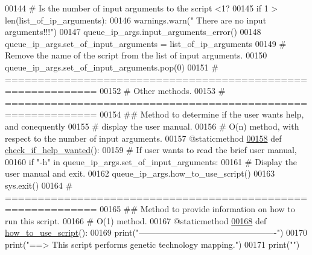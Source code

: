\begin{DoxyCode}
00144         \textcolor{comment}{#   Is the number of input arguments to the script <1?}
00145         \textcolor{keywordflow}{if} 1 > len(list\_of\_ip\_arguments):
00146             warnings.warn(\textcolor{stringliteral}{" There are no input arguments!!!"})
00147             queue\_ip\_args.input\_arguments\_error()
00148         queue\_ip\_args.set\_of\_input\_arguments = list\_of\_ip\_arguments
00149         \textcolor{comment}{# Remove the name of the script from the list of input arguments.}
00150         queue\_ip\_args.set\_of\_input\_arguments.pop(0)
00151     \textcolor{comment}{# ============================================================}
00152     \textcolor{comment}{#   Other methods.}
00153     \textcolor{comment}{# ============================================================}
00154     \textcolor{comment}{##  Method to determine if the user wants help, and conequently}
00155     \textcolor{comment}{#       display the user manual.}
00156     \textcolor{comment}{#   O(n) method, with respect to the number of input arguments.}
00157     @staticmethod
\hypertarget{queue__ip__arguments_8py_source_l00158}{}\hyperlink{classutilities_1_1queue__ip__arguments_1_1queue__ip__args_a1a87ae4035acfa51fe1d1aff53f770f3}{00158}     \textcolor{keyword}{def }\hyperlink{classutilities_1_1queue__ip__arguments_1_1queue__ip__args_a1a87ae4035acfa51fe1d1aff53f770f3}{check\_if\_help\_wanted}():
00159         \textcolor{comment}{# If user wants to read the brief user manual,}
00160         \textcolor{keywordflow}{if} \textcolor{stringliteral}{"-h"} \textcolor{keywordflow}{in} queue\_ip\_args.set\_of\_input\_arguments:
00161             \textcolor{comment}{# Display the user manual and exit.}
00162             queue\_ip\_args.how\_to\_use\_script()
00163             sys.exit()
00164     \textcolor{comment}{# ============================================================}
00165     \textcolor{comment}{##  Method to provide information on how to run this script.}
00166     \textcolor{comment}{#   O(1) method.}
00167     @staticmethod
\hypertarget{queue__ip__arguments_8py_source_l00168}{}\hyperlink{classutilities_1_1queue__ip__arguments_1_1queue__ip__args_a5fecd33a91d20f19acba2fb1b8d1a60e}{00168}     \textcolor{keyword}{def }\hyperlink{classutilities_1_1queue__ip__arguments_1_1queue__ip__args_a5fecd33a91d20f19acba2fb1b8d1a60e}{how\_to\_use\_script}():
00169         print(\textcolor{stringliteral}{"-------------------------------------------------"})
00170         print(\textcolor{stringliteral}{"==>  This script performs genetic technology mapping."})
00171         print(\textcolor{stringliteral}{""})

\end{DoxyCode}
